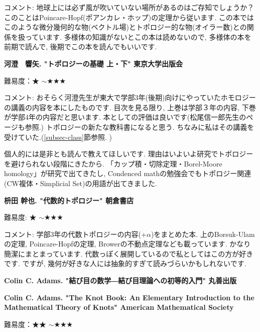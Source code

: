 コメント: 地球上には必ず風が吹いていない場所があるのはご存知でしょうか？ このことはPoincare-Hopf(ポアンカレ・ホップ)の定理から従います. この本ではこのような微分幾何的な物(ベクトル場)とトポロジー的な物(オイラー数)との関係を扱っています. 多様体の知識がないとこの本は読めないので, 多様体の本を前期で読んで, 後期でこの本を読んでもいいです. 
\vspace{8pt}


\textbf{河澄　響矢. "トポロジーの基礎 上・下" 東京大学出版会}  　\vspace{-6pt} 

難易度：★ $\sim$★★★\vspace{-6pt} 

コメント: おそらく河澄先生が東大で学部3年(後期)向けにやっていたホモロジーの講義の内容を本にしたものです. 目次を見る限り, 上巻は学部３年の内容, 下巻が学部4年の内容だと思います. 本としての評価は良いです(松尾信一郎先生のページも参照.) トポロジーの新たな教科書になると思う. ちなみに私はその講義を受けていた.(\ref{subsec-class}節参照. )

個人的には是非とも読んで教えてほしいです. 理由はいよいよ研究でトポロジーを避けられない段階にきたから. 「カップ積・切除定理・Borel-Moore homology」が研究で出てきたし, Condenced mathの勉強会でもトポロジー関連(CW複体・Simplicial Set)の用語が出てきました. 
\vspace{8pt}

\textbf{枡田 幹也. "代数的トポロジー" 朝倉書店}  　\vspace{-6pt} 

難易度: ★ $\sim$★★★\vspace{-6pt} 

コメント: 学部3年の代数トポロジーの内容(+$\alpha$)をまとめた本. 上のBorsuk-Ulamの定理, Poincare-Hopfの定理, Browerの不動点定理なども載っています. かなり簡潔にまとまっています. 代数っぽく展開しているので私としてはこの方が好きです.  ですが, 幾何が好きな人には抽象的すぎて読みづらいかもしれないです. 
\vspace{8pt}


\textbf{Colin C. Adams. "結び目の数学―結び目理論への初等的入門" 丸善出版}  　\vspace{-6pt} 

\textbf{Colin C. Adams. "The Knot Book: An Elementary Introduction to the Mathematical Theory of Knots" American Mathematical Society}  　\vspace{-6pt} 

難易度：★★ $\sim$★★★\vspace{-6pt} 

